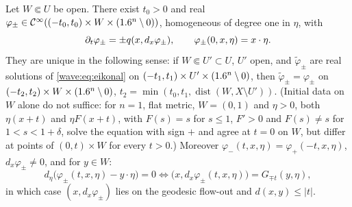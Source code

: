 \begin{lemma}\label{wave:lem:eikonal}
Let $W\Subset U$ be open. There exist $t_0>0$ and real
$\varphi_\pm\in\mathcal{C}^\infty((-t_0,t_0)\times W\times(1.6^n\setminus0))$, homogeneous of degree
one in $\eta$, with
\begin{equation}\label{wave:eq:eikonal}
\partial_t\varphi_\pm=\pm q(x,d_x\varphi_\pm),\qquad \varphi_\pm(0,x,\eta)=x\cdot\eta .
\end{equation}
They are unique in the following sense: if $W\Subset U'\subset U$, $U'$ open, and
$\tilde\varphi_\pm$ are real solutions of \eqref{wave:eq:eikonal} on
$(-t_1,t_1)\times U'\times(1.6^n\setminus0)$, then $\tilde\varphi_\pm=\varphi_\pm$ on
$(-t_2,t_2)\times W\times(1.6^n\setminus0)$, $t_2=\min(t_0,t_1,\operatorname{dist}(W,
X\setminus U'))$. (Initial data on $W$ alone do not suffice: for $n=1$, flat metric,
$W=(0,1)$ and $\eta>0$, both $\eta(x+t)$ and $\eta F(x+t)$, with $F(s)=s$ for $s\le1$,
$F'>0$ and $F(s)\ne s$ for $1<s<1+\delta$, solve the equation with
sign $+$ and agree at $t=0$ on $W$, but differ at points of $(0,t)\times W$ for every
$t>0$.)
Moreover $\varphi_-(t,x,\eta)=\varphi_+(-t,x,\eta)$, $d_x\varphi_\pm\ne0$, and for $y\in W$:
\begin{equation}\label{wave:eq:critical}
d_\eta\big(\varphi_\pm(t,x,\eta)-y\cdot\eta\big)=0\iff\big(x,d_x\varphi_\pm(t,x,\eta)\big)=G_{\mp t}(y,\eta),
\end{equation}
in which case $(x,d_x\varphi_\pm)$ lies on the geodesic flow-out and
$d(x,y)\le|t|$.
\end{lemma}
